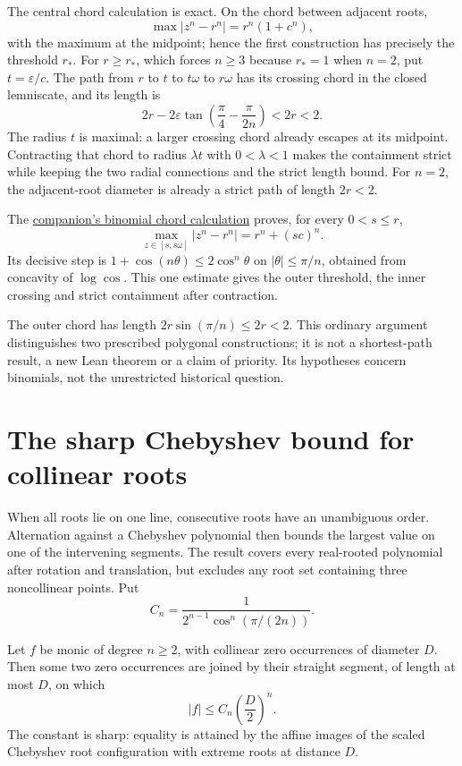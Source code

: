 \documentclass[11pt]{article}
\begin{document}
The central chord calculation is exact.  On the chord between adjacent roots,
\[
 \max |z^n-r^n|=r^n(1+c^n),
\]
with the maximum at the midpoint; hence the first construction has precisely
the threshold $r_*$.  For $r\ge r_*$, which forces $n\ge3$ because $r_*=1$
when $n=2$, put $t=\varepsilon/c$.  The path from $r$ to
$t$ to $t\omega$ to $r\omega$ has its crossing chord in the closed
lemniscate, and its length is
\[
 2r-2\varepsilon\tan\!\left(\frac\pi4-\frac\pi{2n}\right)<2r<2.
\]
The radius $t$ is maximal: a larger crossing chord already escapes at its
midpoint.  Contracting that chord to radius $\lambda t$ with $0<\lambda<1$
makes the containment strict while keeping the two radial connections and the
strict length bound.  For $n=2$, the adjacent-root diameter is already a
strict path of length $2r<2$.

The \href{erdos1041-lemniscate-reasoning-surface.pdf\#binomial-chord-calculation}{companion's binomial chord calculation} proves, for every $0<s\le r$,
\[
 \max_{z\in[s,s\omega]}|z^n-r^n|=r^n+(sc)^n.
\]
Its decisive step is
$1+\cos(n\theta)\le2\cos^n\theta$ on $|\theta|\le\pi/n$,
obtained from concavity of $\log\cos$. This one estimate gives the
outer threshold, the inner crossing and strict containment after contraction.

The outer chord has length $2r\sin(\pi/n)\le2r<2$. This ordinary
argument distinguishes two prescribed polygonal constructions; it is
not a shortest-path result, a new Lean theorem or a claim of priority.
Its hypotheses concern binomials, not the unrestricted historical question.

\section{The sharp Chebyshev bound for collinear roots}
\label{sec:collinear}

When all roots lie on one line, consecutive roots have an unambiguous
order. Alternation against a Chebyshev polynomial then bounds the largest
value on one of the intervening segments. The result covers every real-rooted
polynomial after rotation and translation, but excludes any root set
containing three noncollinear points.  Put
\[
 C_n=\frac{1}{2^{n-1}\cos^n(\pi/(2n))}.
\]

\begin{theorem}
\label{res:sharp-collinear-root-diameter}
Let $f$ be monic of degree $n\ge2$, with collinear zero occurrences of diameter
$D$.  Then some two zero occurrences are joined by their straight segment,
of length at most $D$, on which
\[
 |f|\le C_n\left(\frac D2\right)^n.
\]
The constant is sharp: equality is attained by the affine images of the
scaled Chebyshev root configuration with extreme roots at distance $D$.
\end{theorem}
\end{document}
